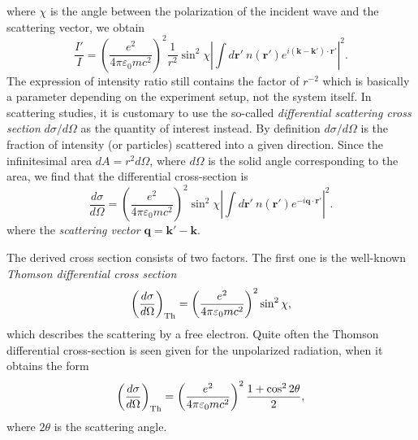 where $\chi$ is the angle between the polarization of the incident wave and the scattering vector, we obtain
\begin{equation}
\frac{I'}{I} = \left(\frac{e^2}{4\pi\varepsilon_0 m c^2} \right)^2 \frac{1}{r^2} \sin^2 \chi \left|\int d\mathbf{r}' \  n(\mathbf{r}')  e^{i (\mathbf{k}-\mathbf{k}')\cdot\mathbf{r}'} \right|^2.
\end{equation}
The expression of intensity ratio still contains the factor of $r^{-2}$ which is basically a parameter depending on the experiment setup, not the system itself. In scattering studies, it is customary to use the so-called \emph{differential scattering cross section} $d \sigma / d\Omega$ as the 
quantity of interest instead. By definition $d \sigma / d\Omega$ is the fraction of intensity (or particles) scattered into a given direction. Since the infinitesimal area $dA = r^2 d \Omega$, where $d \Omega$ is the solid angle corresponding to the area, we find that the differential cross-section is
\begin{equation}
\frac{d \sigma}{d \Omega} = \left(\frac{e^2}{4\pi\varepsilon_0 m c^2} \right)^2 \sin^2 \chi \left|\int d\mathbf{r}' \  n(\mathbf{r}')  e^{-i \mathbf{q}\cdot\mathbf{r}'} \right|^2.
\end{equation}
where the \emph{scattering vector} $\mathbf{q} = \mathbf{k}' - \mathbf{k}$. 

The derived cross section consists of two factors. The first one is the well-known \emph{Thomson differential cross section}
\begin{equation}
\left(\frac{d \sigma}{d \Omega}\right)_{\rm Th} = \left(\frac{e^2}{4\pi\varepsilon_0 m c^2} \right)^2 \sin^2 \chi,
\end{equation}
which describes the scattering by a free electron. Quite often the Thomson differential cross-section is seen given for the unpolarized radiation, when it obtains the form
\begin{equation}
\left(\frac{d \sigma}{d \Omega}\right)_{\rm Th} = \left(\frac{e^2}{4\pi\varepsilon_0 m c^2} \right)^2 \frac{1+\cos^2 2 \theta}{2},
\end{equation}
where $2\theta$ is the scattering angle.


